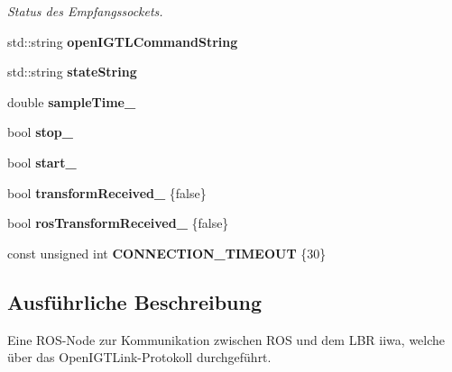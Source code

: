 \begin{DoxyCompactItemize}
\begin{DoxyCompactList}\small\item\em Status des Empfangssockets. \end{DoxyCompactList}\item 
\hypertarget{classRosOpenIgtlBridge_a691ab680de3cd5e45c7ac40816b732a6}{std\-::string {\bfseries open\-I\-G\-T\-L\-Command\-String}}\label{classRosOpenIgtlBridge_a691ab680de3cd5e45c7ac40816b732a6}

\item 
\hypertarget{classRosOpenIgtlBridge_a0a5db0b04705372961630bb4c027695c}{std\-::string {\bfseries state\-String}}\label{classRosOpenIgtlBridge_a0a5db0b04705372961630bb4c027695c}

\item 
\hypertarget{classRosOpenIgtlBridge_a2ea062eeab4c7158b07ee976503ef043}{double {\bfseries sample\-Time\-\_\-}}\label{classRosOpenIgtlBridge_a2ea062eeab4c7158b07ee976503ef043}

\item 
\hypertarget{classRosOpenIgtlBridge_a38daf9dd118068189027ba9ba94c4490}{bool {\bfseries stop\-\_\-}}\label{classRosOpenIgtlBridge_a38daf9dd118068189027ba9ba94c4490}

\item 
\hypertarget{classRosOpenIgtlBridge_ac71d24bebd6fc3271705f429e72e3073}{bool {\bfseries start\-\_\-}}\label{classRosOpenIgtlBridge_ac71d24bebd6fc3271705f429e72e3073}

\item 
\hypertarget{classRosOpenIgtlBridge_a739a2b4feace96f89628c36a9357ccfe}{bool {\bfseries transform\-Received\-\_\-} \{false\}}\label{classRosOpenIgtlBridge_a739a2b4feace96f89628c36a9357ccfe}

\item 
\hypertarget{classRosOpenIgtlBridge_aab902594c15e9b69c6f0b7bdb2c2814c}{bool {\bfseries ros\-Transform\-Received\-\_\-} \{false\}}\label{classRosOpenIgtlBridge_aab902594c15e9b69c6f0b7bdb2c2814c}

\item 
\hypertarget{classRosOpenIgtlBridge_a701bc14cf735f3e01d807e8c7074d0e5}{const unsigned int {\bfseries C\-O\-N\-N\-E\-C\-T\-I\-O\-N\-\_\-\-T\-I\-M\-E\-O\-U\-T} \{30\}}\label{classRosOpenIgtlBridge_a701bc14cf735f3e01d807e8c7074d0e5}

\end{DoxyCompactItemize}


\subsection{Ausführliche Beschreibung}
Eine R\-O\-S-\/\-Node zur Kommunikation zwischen R\-O\-S und dem L\-B\-R iiwa, welche über das Open\-I\-G\-T\-Link-\/\-Protokoll durchgeführt. 

